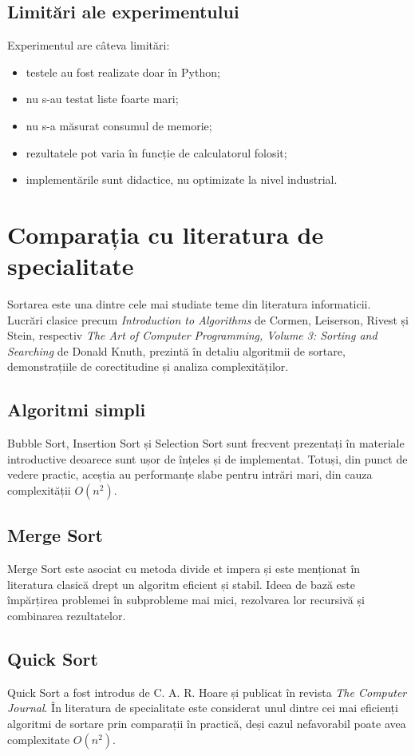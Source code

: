 \documentclass[a4paper,12pt]{article}
\begin{document}
\subsection{Limitări ale experimentului}
Experimentul are câteva limitări:
\begin{itemize}
    \item testele au fost realizate doar în Python;
    \item nu s-au testat liste foarte mari;
    \item nu s-a măsurat consumul de memorie;
    \item rezultatele pot varia în funcție de calculatorul folosit;
    \item implementările sunt didactice, nu optimizate la nivel industrial.
\end{itemize}

\section{Comparația cu literatura de specialitate}

Sortarea este una dintre cele mai studiate teme din literatura informaticii. Lucrări clasice precum \textit{Introduction to Algorithms} de Cormen, Leiserson, Rivest și Stein, respectiv \textit{The Art of Computer Programming, Volume 3: Sorting and Searching} de Donald Knuth, prezintă în detaliu algoritmii de sortare, demonstrațiile de corectitudine și analiza complexităților.

\subsection{Algoritmi simpli}
Bubble Sort, Insertion Sort și Selection Sort sunt frecvent prezentați în materiale introductive deoarece sunt ușor de înțeles și de implementat. Totuși, din punct de vedere practic, aceștia au performanțe slabe pentru intrări mari, din cauza complexității $O(n^2)$.

\subsection{Merge Sort}
Merge Sort este asociat cu metoda divide et impera și este menționat în literatura clasică drept un algoritm eficient și stabil. Ideea de bază este împărțirea problemei în subprobleme mai mici, rezolvarea lor recursivă și combinarea rezultatelor.

\subsection{Quick Sort}
Quick Sort a fost introdus de C. A. R. Hoare și publicat în revista \textit{The Computer Journal}. În literatura de specialitate este considerat unul dintre cei mai eficienți algoritmi de sortare prin comparații în practică, deși cazul nefavorabil poate avea complexitate $O(n^2)$.
\end{document}
